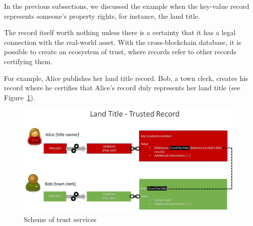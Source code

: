\begin{multicols}{2}
In the previous subsections, we discussed the example when the key-value record represents someone’s property rights, for instance, the land title.

The record itself worth nothing unless there is a certainty that it has a legal connection with the real-world asset. With the cross-blockchain database, it is possible to create an ecosystem of trust, where records refer to other records certifying them.

For example, Alice publishes her land title record. Bob, a town clerk, creates his record where he certifies that Alice’s record duly represents her land title (see Figure~\ref{chap1-fig07}).
\end{multicols}

\begin{figure}[H]
\centering
\includegraphics[scale=1.8]{src/Figures/chap1/chap1-fig07.jpg}
\caption{Scheme of trust services}\label{chap1-fig07}
\end{figure}

